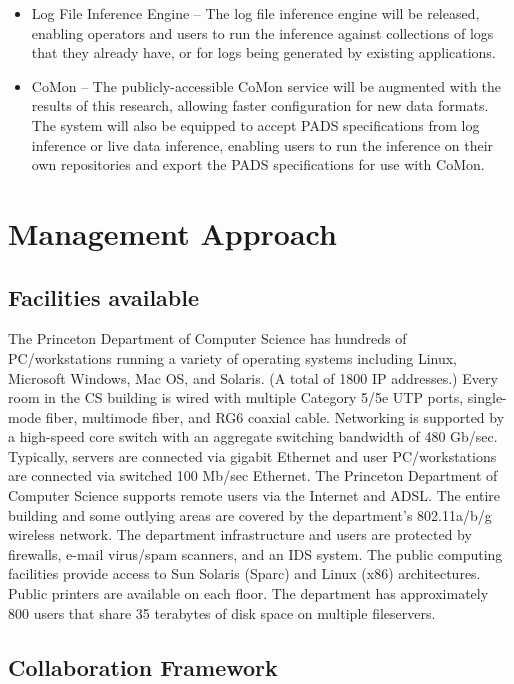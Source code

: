 \documentclass[12pt]{article}
\begin{document}
\begin{itemize}
\item Log File Inference Engine -- The log file inference engine will
be released, enabling operators and users to run the inference against
collections of logs that they already have, or for logs being
generated by existing applications.

\item CoMon -- The publicly-accessible CoMon service will be
augmented with the results of this research, allowing faster
configuration for new data formats. The system will also be equipped
to accept PADS specifications from log inference or live data
inference, enabling users to run the inference on their own
repositories and export the PADS specifications for use with CoMon.

\end{itemize}

\section{Management Approach}

\subsection{Facilities available}

The Princeton Department of Computer Science has hundreds of
PC/workstations running a variety of operating systems including
Linux, Microsoft Windows, Mac OS, and Solaris. (A total of 1800 IP
addresses.) Every room in the CS building is wired with multiple
Category 5/5e UTP ports, single-mode fiber, multimode fiber, and RG6
coaxial cable. Networking is supported by a high-speed core switch
with an aggregate switching bandwidth of 480 Gb/sec. Typically,
servers are connected via gigabit Ethernet and user PC/workstations
are connected via switched 100 Mb/sec Ethernet. The Princeton
Department of Computer Science supports remote users via the Internet
and ADSL. The entire building and some outlying areas are covered by
the department's 802.11a/b/g wireless network. The department
infrastructure and users are protected by firewalls, e-mail virus/spam
scanners, and an IDS system. The public computing facilities provide
access to Sun Solaris (Sparc) and Linux (x86) architectures. Public
printers are available on each floor. The department has approximately
800 users that share 35 terabytes of disk space on multiple
fileservers.

\subsection{Collaboration Framework}
\end{document}

